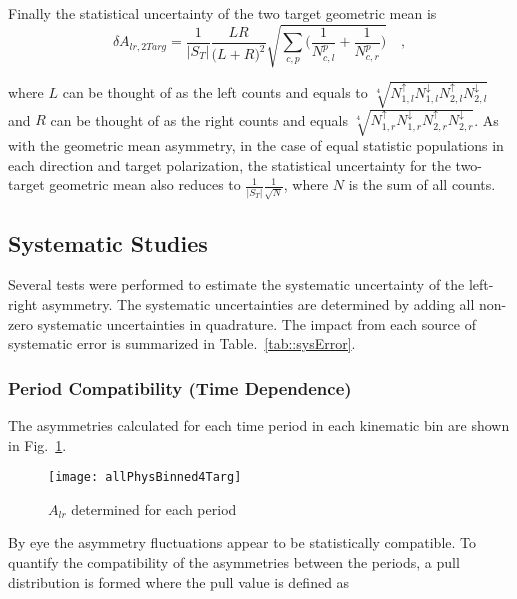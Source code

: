 Finally the statistical uncertainty of the two target geometric mean is
\begin{equation}
  \delta A_{lr,2Targ} = \frac{1}{|S_T|}
  \frac{LR}{\Big( L+R \Big)^2}
  \sqrt{
    \sum_{c,p}
    \Big(
    \frac{1}{N_{c,l}^{p}}
    + \frac{1}{N_{c,r}^p}
    \Big)
  } \quad,
\end{equation}

\noindent
where $L$ can be thought of as the left counts and equals to
$\sqrt[4]{N_{1,l}^\uparrow N_{1,l}^\downarrow N_{2,l}^\uparrow
  N_{2,l}^\downarrow}$ and $R$ can be thought of as the right counts and equals
$\sqrt[4]{N_{1,r}^\uparrow N_{1,r}^\downarrow N_{2,r}^\uparrow
  N_{2,r}^\downarrow}$.  As with the geometric mean asymmetry, in the case of
equal statistic populations in each direction and target polarization, the
statistical uncertainty for the two-target geometric mean also reduces to
$\frac{1}{|S_T|}\frac{1}{\sqrt{N}}$, where $N$ is the sum of all counts.


\subsection{Systematic Studies} \label{sec::systematics}
Several tests were performed to estimate the systematic uncertainty of the
left-right asymmetry.  The systematic uncertainties are determined by adding all
non-zero systematic uncertainties in quadrature.  The impact from each source of
systematic error is summarized in Table.~\ref{tab::sysError}.

\subsubsection{Period Compatibility (Time Dependence)}\label{sec::sysPulls}
The asymmetries calculated for each time period in each kinematic bin are shown
in Fig.~\ref{fig::allPhysBinned4Targ}.

\begin{figure}[h!t]
  \begin{center}
    \texttt{[image: allPhysBinned4Targ]}
    \caption{$A_{lr}$ determined for each period}
    \label{fig::allPhysBinned4Targ}
  \end{center}
\end{figure}

\noindent
By eye the asymmetry fluctuations appear to be statistically compatible.  To
quantify the compatibility of the asymmetries between the periods, a pull
distribution is formed where the pull value is defined as

